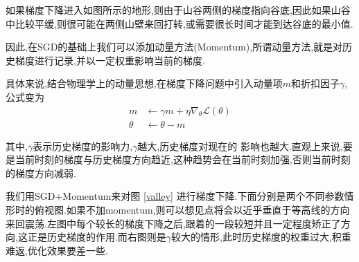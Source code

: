 如果梯度下降进入如图所示的地形,则由于山谷两侧的梯度指向谷底,因此如果山谷中比较平缓,则很可能在两侧山壁来回打转,或需要很长时间才能到达谷底的最小值.

因此,在SGD的基础上我们可以添加动量方法(Momentum),所谓动量方法,就是对历史梯度进行记录,并以一定权重影响当前的梯度.

具体来说,结合物理学上的动量思想,在梯度下降问题中引入动量项$m$和折扣因子$\gamma$,公式变为 
\begin{equation}
	\begin{aligned}
		m &\leftarrow \gamma m+\eta \nabla_{\theta} \mathcal L(\theta)
		\\
		\theta &\leftarrow \theta-m
	\end{aligned}
\end{equation}

其中,$\gamma$表示历史梯度的影响力,$\gamma$越大,历史梯度对现在的 影响也越大.直观上来说,要是当前时刻的梯度与历史梯度方向趋近,这种趋势会在当前时刻加强,否则当前时刻的梯度方向减弱.

我们用SGD+Momentum来对图 \ref{valley} 进行梯度下降.下面分别是两个不同参数情形时的俯视图.如果不加momentum,则可以想见点将会以近乎垂直于等高线的方向来回震荡.左图中每个较长的梯度下降之后,跟着的一段较短并且一定程度矫正了方向,这正是历史梯度的作用.而右图则是$\gamma$较大的情形,此时历史梯度的权重过大,积重难返,优化效果要差一些.
\begin{figure}[htbp]
	\centering
\end{figure}


